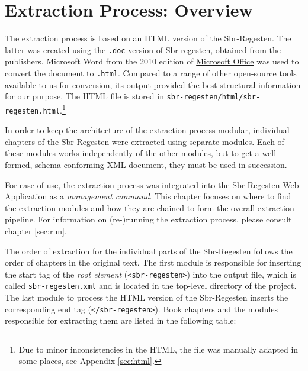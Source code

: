 \section{Extraction Process: Overview}
\label{sec:overview}

The extraction process is based on an HTML version of the
Sbr-Regesten. The latter was created using the \texttt{.doc} version
of Sbr-regesten, obtained from the publishers. Microsoft Word from the
2010 edition of \href{http://office.microsoft.com/en-us/}{Microsoft
  Office} was used to convert the document to \texttt{.html}. Compared
to a range of other open-source tools available to us for conversion,
its output provided the best structural information for our purpose.
The HTML file is stored in
\texttt{sbr-regesten/html/sbr-regesten.html}.\footnote{Due to minor
  inconsistencies in the HTML, the file was manually adapted in some
  places, see Appendix \ref{sec:html}.}

In order to keep the architecture of the extraction process modular,
individual chapters of the Sbr-Regesten were extracted using separate
modules. Each of these modules works independently of the other
modules, but to get a well-formed, schema-conforming XML document,
they must be used in succession.

For ease of use, the extraction process was integrated into the
Sbr-Regesten Web Application as a \emph{management command}. This
chapter focuses on where to find the extraction modules and how they
are chained to form the overall extraction pipeline. For information
on (re-)running the extraction process, please consult chapter
\ref{sec:run}.

The order of extraction for the individual parts of the Sbr-Regesten
follows the order of chapters in the original text. The first module
is responsible for inserting the start tag of the \emph{root element}
(\texttt{<sbr-regesten>}) into the output file, which is called
\texttt{sbr-regesten.xml} and is located in the top-level directory of
the project. The last module to process the HTML version of the
Sbr-Regesten inserts the corresponding end tag
(\texttt{</sbr-regesten>}). Book chapters and the modules responsible
for extracting them are listed in the following table:

